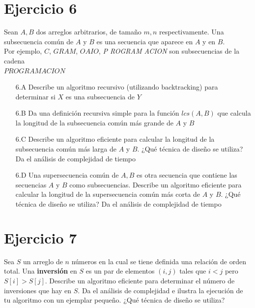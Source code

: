 \documentclass[12pt]{article}
\begin{document}
\section*{Ejercicio 6}
\noindent Sean $A, B$ dos arreglos arbitrarios, de tamaño $m, n$ respectivamente. Una subsecuencia común de $A$ y $B$ es una secuencia que aparece en $A$ y en $B$.\\
Por ejemplo, $C$, $GRAM$, $OAIO$, \textit{P ROGRAM ACION} son subsecuencias de la cadena\\
$PROGRAMACION$
\begin{enumerate}
    \item[6.A] Describe un algoritmo recursivo (utilizando backtracking) para determinar si $X$ es una subsecuencia de $Y$
    \item[6.B] Da una definición recursiva simple para la función $lcs(A, B)$ que calcula la longitud de la subsecuencia común más grande de $A$ y $B$
    \item[6.C] Describe un algoritmo eficiente para calcular la longitud de la subsecuencia común más larga de $A$ y $B$. ¿Qué técnica de diseño se utiliza? Da el análisis de complejidad de tiempo
    \item[6.D] Una supersecuencia común de $A, B$ es otra secuencia que contiene las secuencias $A$ y $B$ como subsecuencias. Describe un algoritmo eficiente para calcular la longitud de la supersecuencia común más corta de $A$ y $B$. ¿Qué técnica de diseño se utiliza? Da el análisis de complejidad de tiempo
\end{enumerate}

\section*{Ejercicio 7}
\noindent Sea $S$ un arreglo de $n$ números en la cual se tiene definida una relación de orden total. Una \textbf{inversión} en $S$ es un par de elementos $(i, j)$ tales que $i < j$ pero $S[i] > S[j]$. Describe un algoritmo eficiente para determinar el número de inversiones que hay en $S$. Da el análisis de complejidad e ilustra la ejecución de tu algoritmo con un ejemplar pequeño. ¿Qué técnica de diseño se utiliza?
\end{document}
